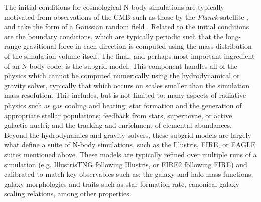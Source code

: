 The initial conditions for cosmological N-body simulations are typically motivated from observations of the CMB such as those by the \textit{Planck} satellite \parencite[][]{planck15}, and take the form of a Gaussian random field \parencite[e.g.][]{efstathiou85}. Related to the initial conditions are the boundary conditions, which are typically periodic such that the long-range gravitional force in each direction is computed using the mass distribution of the simulation volume itself. The final, and perhaps most important ingredient of an N-body code, is the subgrid model. This component handles all of the physics which cannot be computed numerically using the hydrodynamical or gravity solver, typically that which occurs on scales smaller than the simulation mass resolution. This includes, but is not limited to: many aspects of radiative physics such as gas cooling and heating; star formation and the generation of appropriate stellar populations; feedback from stars, supernovae, or active galactic nuclei; and the tracking and enrichment of elemental abundances. Beyond the hydrodynamics and gravity solvers, these subgrid models are largely what define a suite of N-body simulations, such as the Illustris, FIRE, or EAGLE suites mentioned above. These models are typically refined over multiple runs of a simulation (e.g. IllustrisTNG following Illustris, or FIRE2 following FIRE) and calibrated to match key observables such as: the galaxy and halo mass functions, galaxy morphologies and traits such as star formation rate, canonical galaxy scaling relations, among other properties.

